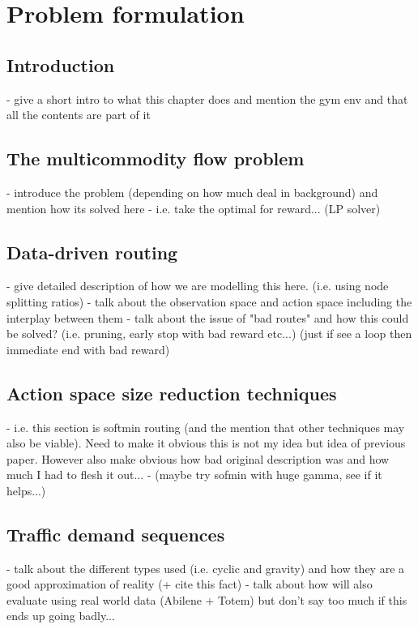 \chapter{Problem formulation}

\section{Introduction}
- give a short intro to what this chapter does and mention the gym env and that all the contents are part of it

\section{The multicommodity flow problem}
 - introduce the problem (depending on how much deal in background) and mention how its solved here
 - i.e. take the optimal for reward... (LP solver)

\section{Data-driven routing}
- give detailed description of how we are modelling this here. (i.e. using node splitting ratios)
- talk about the observation space and action space including the interplay between them
- talk about the issue of "bad routes" and how this could be solved? (i.e. pruning, early stop with bad reward etc...) (just if see a loop then immediate end with bad reward)

\section{Action space size reduction techniques}
- i.e. this section is softmin routing (and the mention that other techniques may also be viable). Need to make it obvious this is not my idea but idea of previous paper. However also make obvious how bad original description was and how much I had to flesh it out...
- (maybe try sofmin with huge gamma, see if it helps...)

\section{Traffic demand sequences}
- talk about the different types used (i.e. cyclic and gravity) and how they are a good approximation of reality (+ cite this fact)
- talk about how will also evaluate using real world data (Abilene + Totem) but don't say too much if this ends up going badly...

